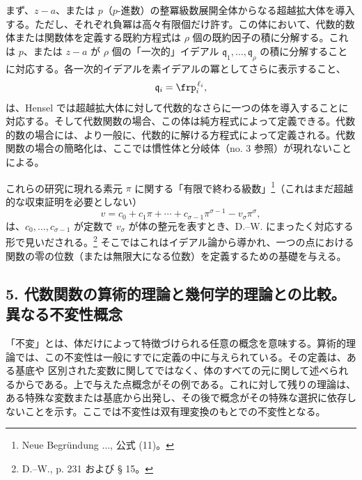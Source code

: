 \documentclass[11pt]{article}
\begin{document}
まず、\(z-a\)、または \(p\)（\(p\)-進数）の整冪級数展開全体からなる超越拡大体を導入する。ただし、それぞれ負冪は高々有限個だけ許す。この体において、代数的数体または関数体を定義する既約方程式は \(\rho\) 個の既約因子の積に分解する。これは \(p\)、または \(z-a\) が \(\rho\) 個の「一次的」イデアル \(\mathfrak q_1,\ldots,\mathfrak q_\rho\) の積に分解することに対応する。各一次的イデアルを素イデアルの冪としてさらに表示すること、
\[
\mathfrak q_i=\frp_i^{\,\ell_i},
\]
は、Hensel では超越拡大体に対して代数的なさらに一つの体を導入することに対応する。そして代数関数の場合、この体は純方程式によって定義できる。代数的数の場合には、より一般に、代数的に解ける方程式によって定義される。代数関数の場合の簡略化は、ここでは慣性体と分岐体（no. 3 参照）が現れないことによる。

これらの研究に現れる素元 \(\pi\) に関する「有限で終わる級数」\footnote{Neue Begründung \(\ldots\), 公式 (11)。}（これはまだ超越的な収束証明を必要としない）
\[
v=c_0+c_1\pi+\cdots+c_{\sigma-1}\pi^{\sigma-1}-v_\sigma\pi^\sigma,
\]
は、\(c_0,\ldots,c_{\sigma-1}\) が定数で \(v_\sigma\) が体の整元を表すとき、D.--W. にまったく対応する形で見いだされる。\footnote{D.--W., p. 231 および § 15。} そこではこれはイデアル論から導かれ、一つの点における関数の零の位数（または無限大になる位数）を定義するための基礎を与える。

\subsection*{5. 代数関数の算術的理論と幾何学的理論との比較。異なる不変性概念}
「不変」とは、体だけによって特徴づけられる任意の概念を意味する。算術的理論では、この不変性は一般にすでに定義の中に与えられている。その定義は、ある基底や 区別された変数に関してではなく、体のすべての元に関して述べられるからである。上で与えた点概念がその例である。これに対して残りの理論は、ある特殊な変数または基底から出発し、その後で概念がその特殊な選択に依存しないことを示す。ここでは不変性は双有理変換のもとでの不変性となる。
\end{document}

